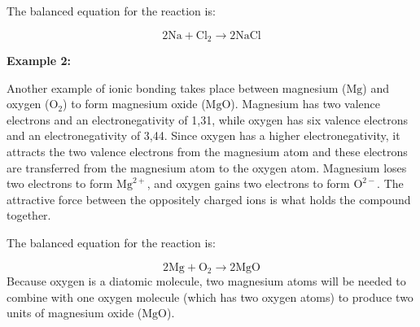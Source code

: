         \label{m38684*id142300}The balanced equation for the reaction is:\par 
        \label{m38684*id142305}\nopagebreak\noindent{}
    \begin{equation*}
    2\text{Na}+\text{Cl}_{2}\to 2\text{NaCl}
      \end{equation*}    

        \label{m38684*id142353}
          \textbf{Example 2:}
        \par 
        \label{m38684*id142360}Another example of ionic bonding takes place between magnesium ($\text{Mg}$) and oxygen ($\text{O}_2$) to form magnesium oxide ($\text{MgO}$). Magnesium has two valence electrons and an electronegativity of 1,31, while oxygen has six valence electrons and an electronegativity of 3,44. Since oxygen has a higher electronegativity, it attracts the two valence electrons from the magnesium atom and these electrons are transferred from the magnesium atom to the oxygen atom. Magnesium loses two electrons to form ${\text{Mg}}^{2+}$, and oxygen gains two electrons to form ${\text{O}}^{2-}$. The attractive force between the oppositely charged ions is what holds the compound together.\par 
        \label{m38684*id138529}The balanced equation for the reaction is:\par 
        \label{m38684*id138535}\nopagebreak\noindent{}
    \begin{equation*}
    2\text{Mg}+{\text{O}}_{2}\to 2\text{MgO}
      \end{equation*}
        \label{m38684*id142521}Because oxygen is a diatomic molecule, two magnesium atoms will be needed to combine with one oxygen molecule (which has two oxygen atoms) to produce two units of magnesium oxide ($\text{MgO}$).\par 
% 
% 
